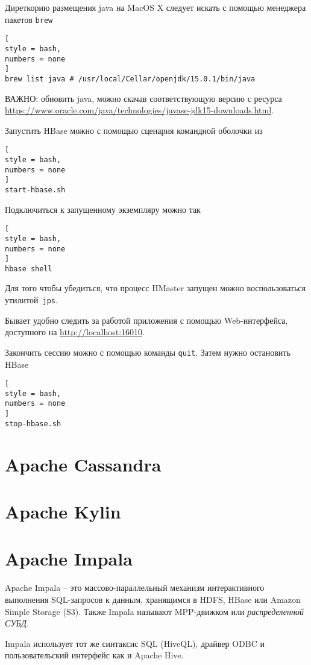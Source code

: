\documentclass[%
	11pt,
	a4paper,
	utf8,
		]{article}
\begin{document}
Диреткорию размещения java на MacOS X следует искать с помощью менеджера пакетов \texttt{brew}
\begin{lstlisting}[
style = bash,
numbers = none
]
brew list java # /usr/local/Cellar/openjdk/15.0.1/bin/java
\end{lstlisting}

ВАЖНО: обновить java, можно скачав соответствующую версию с ресурса \url{https://www.oracle.com/java/technologies/javase-jdk15-downloads.html}.

Запустить HBase можно с помощью сценария командной оболочки из 
\begin{lstlisting}[
style = bash,
numbers = none	
]
start-hbase.sh
\end{lstlisting}

Подключиться к запущенному экземпляру можно так
\begin{lstlisting}[
style = bash,
numbers = none	
]
hbase shell
\end{lstlisting}

Для того чтобы убедиться, что процесс HMaster запущен можно воспользоваться утилитой~\texttt{jps}.

Бывает удобно следить за работой приложения с помощью Web-интерфейса, доступного на \url{http://localhost:16010}.

Закончить сессию можно с помощью команды \texttt{quit}. Затем нужно остановить HBase
\begin{lstlisting}[
style = bash,
numbers = none
]
stop-hbase.sh
\end{lstlisting}


\section{Apache Cassandra}

\section{Apache Kylin}


\section{Apache Impala}

Apache Impala -- это массово-параллельный механизм интерактивного выполнения SQL-запросов к данным, хранящимся в HDFS, HBase или Amazon Simple Storage (S3). Также Impala называют MPP-движком или \emph{распределенной СУБД}.

Impala использует тот же синтаксис SQL (HiveQL), драйвер ODBC и пользовательский интерфейс как и Apache Hive.
\end{document}
